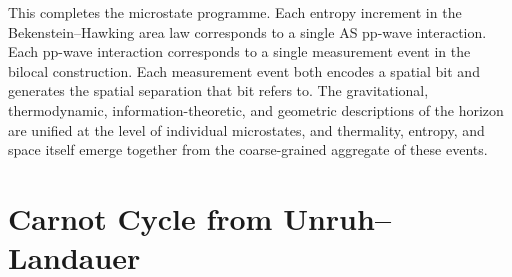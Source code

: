\documentclass[12pt,a4paper]{article}
\begin{document}

%
%
%


This completes the microstate programme. Each entropy increment in the Bekenstein--Hawking area law corresponds to a single AS pp-wave interaction. Each pp-wave interaction corresponds to a single measurement event in the bilocal construction. Each measurement event both encodes a spatial bit and generates the spatial separation that bit refers to. The gravitational, thermodynamic, information-theoretic, and geometric descriptions of the horizon are unified at the level of individual microstates, and thermality, entropy, and space itself emerge together from the coarse-grained aggregate of these events.

\section{Carnot Cycle from Unruh--Landauer}
\label{sec:carnot}
\end{document}
